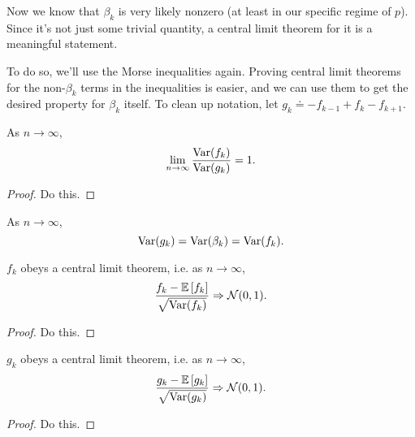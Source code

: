 \documentclass[twoside,10pt]{report}
\begin{document}
Now we know that $\beta_{k}$ is very likely nonzero (at least in our specific regime of $p$). Since it's not just some trivial quantity, a central limit theorem for it is a meaningful statement.

To do so, we'll use the Morse inequalities again. Proving central limit theorems for the non-$\beta_{k}$ terms in the inequalities is easier, and we can use them to get the desired property for $\beta_{k}$ itself. To clean up notation, let $g_{k} \doteq -f_{k-1}+f_{k}-f_{k+1}$.

\begin{lem}
\label{lem:var}
As $n\to \infty$,
\[
	\lim_{n \to \infty} \frac{\operatorname{Var}(f_{k})}{\operatorname{Var}(g_{k})} =1.
\] 
\end{lem}
\begin{proof}
	{\color{red}Do this.}
\end{proof}

\begin{cor}
\label{cor:var}
As $n\to \infty$,
\[
	\operatorname{Var}(g_{k}) = \operatorname{Var}(\beta_{k}) = \operatorname{Var}(f_{k}).
\]
\end{cor}

\begin{lem}
\label{lem:fk-ctl}
$f_{k}$ obeys a central limit theorem, i.e. as $n\to \infty$,
\[
	\frac{f_{k}- \mathbb{E}\left[ f_{k} \right]}{\sqrt{\operatorname{Var}(f_{k})} } \Rightarrow \mathcal{N}(0,1).
\] 
\end{lem}
\begin{proof}
	{\color{red}Do this}.
\end{proof}

\begin{lem}
\label{lem:gk-ctl}
$g_{k}$ obeys a central limit theorem, i.e. as $n\to \infty$,
\[
        \frac{g_{k}- \mathbb{E}\left[ g_{k} \right]}{\sqrt{\operatorname{Var}(g_{k})} } \Rightarrow \mathcal{N}(0,1).
\]
\end{lem}
\begin{proof}
        {\color{red}Do this}.
\end{proof}
\end{document}
